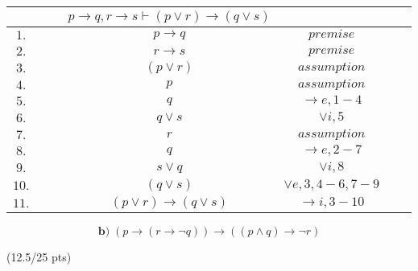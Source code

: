 \documentclass[a4paper,12pt]{article}
\begin{document}
\begin{tcolorbox}
    \centering
    \begin{tabular}{ccccccc}
        & & & $p \rightarrow q, r \rightarrow s \vdash (p \vee r) \rightarrow (q \vee s)$ & & &\\
        \hline
        $1.$ & & & $p \rightarrow q$ & $premise$ & &\\
        $2.$ & & & $r \rightarrow s$ & $premise$ & &\\
        \cline{2-7}
        $3.$ & \multicolumn{1}{|c}{} & & $(p\lor r)$ & $assumption$ & & \multicolumn{1}{c|}{}\\
        \cline{3-6}
        $4.$ & \multicolumn{1}{|c}{} & \multicolumn{1}{|c}{} & $p$ & $assumption$ & \multicolumn{1}{c|}{} & \multicolumn{1}{c|}{}\\
        $5.$ & \multicolumn{1}{|c}{} & \multicolumn{1}{|c}{} & $q$ & $\rightarrow e, 1-4$ & \multicolumn{1}{c|}{} & \multicolumn{1}{c|}{}\\
        $6.$ & \multicolumn{1}{|c}{} & \multicolumn{1}{|c}{} & $q\lor s$ & $\lor i, 5$ & \multicolumn{1}{c|}{} & \multicolumn{1}{c|}{}\\
        \cline{3-6}
        \cline{3-6}
        $7.$ & \multicolumn{1}{|c}{} & \multicolumn{1}{|c}{} & $r$ & $assumption$ & \multicolumn{1}{c|}{} & \multicolumn{1}{c|}{}\\
        $8.$ & \multicolumn{1}{|c}{} & \multicolumn{1}{|c}{} & $q$ & $\rightarrow e, 2-7$ & \multicolumn{1}{c|}{} & \multicolumn{1}{c|}{}\\
        $9.$ & \multicolumn{1}{|c}{} & \multicolumn{1}{|c}{} & $s\lor q$ & $\lor i, 8$ & \multicolumn{1}{c|}{} & \multicolumn{1}{c|}{}\\
        \cline{3-6}
        $10.$ & \multicolumn{1}{|c}{} & & $(q\lor s)$ & $\lor e, 3, 4-6, 7-9$ & & \multicolumn{1}{c|}{}\\
        \cline{2-7}
        $11.$ & & & $(p \lor r) \rightarrow (q\lor s)$ & $\rightarrow i, 3-10 $ & &
        

    \end{tabular}
\end{tcolorbox}

\begin{equation*}
     \textbf{b)} \;  (p \rightarrow (r \rightarrow \neg q)) \rightarrow ((p \wedge q) \rightarrow \neg r)
\end{equation*}

\hfill \small{(12.5/25 pts)}\\
\end{document}
